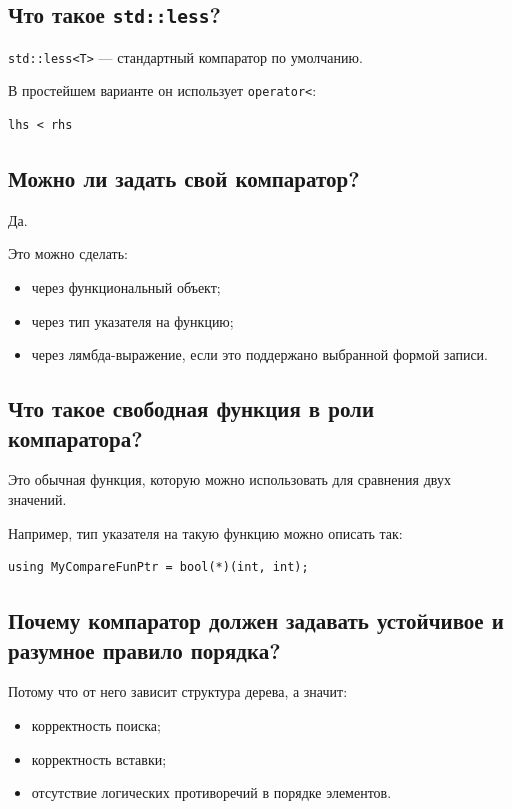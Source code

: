 \subsection{Что такое \texttt{std::less}?}

\texttt{std::less<T>} --- стандартный компаратор по умолчанию.

В простейшем варианте он использует \texttt{operator<}:
\begin{verbatim}
lhs < rhs
\end{verbatim}


\subsection{Можно ли задать свой компаратор?}

Да.

Это можно сделать:
\begin{itemize}
    \item через функциональный объект;
    \item через тип указателя на функцию;
    \item через лямбда-выражение, если это поддержано выбранной формой записи.
\end{itemize}


\subsection{Что такое свободная функция в роли компаратора?}

Это обычная функция, которую можно использовать для сравнения двух значений.

Например, тип указателя на такую функцию можно описать так:
\begin{verbatim}
using MyCompareFunPtr = bool(*)(int, int);
\end{verbatim}


\subsection{Почему компаратор должен задавать устойчивое и разумное правило порядка?}

Потому что от него зависит структура дерева, а значит:
\begin{itemize}
    \item корректность поиска;
    \item корректность вставки;
    \item отсутствие логических противоречий в порядке элементов.
\end{itemize}

